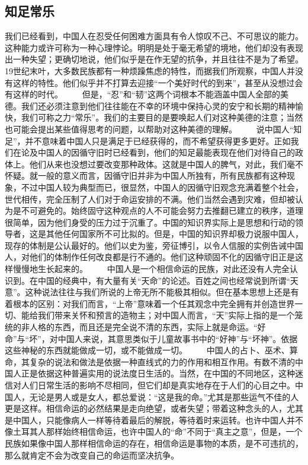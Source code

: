 \documentclass[12pt,oneside]{book}
\begin{document}
\begin{common-format}
\chapter{知足常乐}
我们已经看到，中国人在忍受任何困难方面具有令人惊叹不己、不可思议的能力。这种能力或许可称为一种心理悖论。明明是处于毫无希望的境地，他们却没有表现出一种失望；更确切地说，他们似乎是在作无望的抗争，并且往往不是为了希望。19世纪末叶，大多数民族都有一种烦躁焦虑的特性，而据我们所观察，中国人并没有这样的特性。他们似乎并不打算去迎接“一个美好时代的到来”，甚至从没想过会有这样的时代。 
　　但是，“忍”和“韧”这两个词根本不能涵盖中国人全部的美德。我们还必须注意到他们往往能在不幸的环境中保持心灵的安宁和长期的精神愉快，我们可称之力“常乐”。我们的主要目的是要唤起人们对这种美德的注意；当然也可能会提出某些值得思考的问题，以帮助对这种美德的理解。 
　　说中国人“知足”，并不意味着中国人只是满足于已经获得的，而不希望获得更多更好。正如我们在论及中国人的因循守旧时已经看到，他们的知足最能表现在他们对待自己的政体上。他们从来也没想过要改变那种政体。这就是中国人的脾气，对此，我们毫不怀疑。就一般的意义而言，因循守旧并非为中国人所独有，所有民族都有这种现象，不过中国人较为典型而已，很显然，中国人的因循守旧观念充满着整个社会，世代相传，完全压制了人们对于命运安排的不满。他们当然会遇到灾难，但却被认为是不可避免的。始终固守这种观点的人不可能会努力去推翻已建立的秩序，道理很简单，因为他们身受的压力过于沉重了。中国的知识界实际上是思想和行动的领导者，这是其他任何国家所不可比拟的。但是，中国的知识界却极力说服中国人，现存的体制是公认最好的。他们以史为鉴，旁征博引，以令人信服的实例告诫中国人，对他们的体制作任何改良都是行不通的。他们这种顽固不化的因循守旧正是这样慢慢地生长起来的。 
　　中国人是一个相信命运的民族，对此还没有人完全认识到。在中国的经典中，有大量有关“天命”的论述。百姓之间也经常说到所谓“天意”。这种说法往往与我们所说的上帝无所不能极其相似。但在基本思想上还是有着根本的区别：对我们而言，“上帝”意味着一个任其观念中完全拥有并创造世界一切、能给我们带来关怀和预言的造物主；对中国人而言，“天”实际上指的是一个笼统的非人格的东西，而且还是完全说不清的东西，实际上就是命运。“好命”与“坏”，对中国人来说，其意思类似于儿童故事书中的“好神”与“坏神”。依据这些神秘的东西就能做成一切，或不能做成一切。 
　　中国人的占卜、巫术、算命，其复杂的说法和做法是依据一种直线式的力的作用和相互作用。有数不清的中国人正是依据这种普遍实用的说法度日生活的。当然，在中国的不同地区，这种迷信对人们日常生活的影响不尽相同，但它们却是真实地存在于人们的心目之中。中国人，无论是男人或是女人，都总爱说：“这是我的命。”尤其是那些运气不佳的人更是这样。相信命运的必然结果是走向绝望，或者失望；带着这种念头的人，尤其是中国人，只能像病人一样等待着最后的解脱，等待着时来运转。也许中国人并不像土耳其人那样始终相信命运，也许中国人的“命”不同于“真主之意”，但是，一个民族如果像中国人那样相信命运的存在，相信命运是事物的本质，是不可违抗的，那么就肯定不会为改变自己的命运而坚决抗争。 

\end{common-format}
\end{document}
